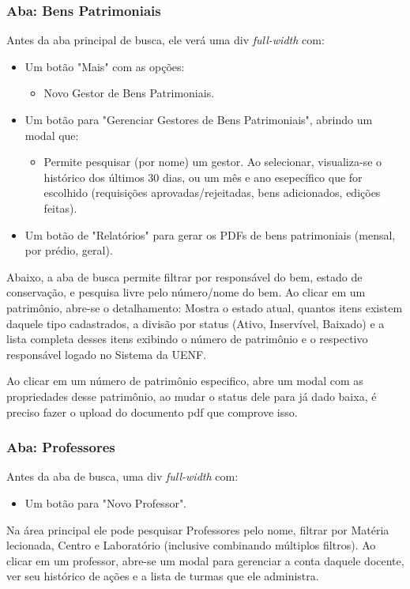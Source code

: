 \subsubsection{Aba: Bens Patrimoniais}
Antes da aba principal de busca, ele verá uma div \textit{full-width} com:
\begin{itemize}
    \item Um botão "Mais" com as opções:
     \begin{itemize}
         \item Novo Gestor de Bens Patrimoniais.
     \end{itemize}
    \item Um botão para "Gerenciar Gestores de Bens Patrimoniais", abrindo um modal que:
    \begin{itemize}
        \item Permite pesquisar (por nome) um gestor. Ao selecionar, visualiza-se o histórico dos últimos 30 dias, ou um mês e ano esepecífico que for escolhido (requisições aprovadas/rejeitadas, bens adicionados, edições feitas).
    \end{itemize}
    \item Um botão de "Relatórios" para gerar os PDFs de bens patrimoniais (mensal, por prédio, geral).
\end{itemize}
Abaixo, a aba de busca permite filtrar por responsável do bem, estado de conservação, e pesquisa livre pelo número/nome do bem. Ao clicar em um patrimônio, abre-se o detalhamento:
Mostra o estado atual, quantos itens existem daquele tipo cadastrados, a divisão por status (Ativo, Inservível, Baixado) e a lista completa desses itens exibindo o número de patrimônio e o respectivo responsável logado no Sistema da UENF.

Ao clicar em um número de patrimônio especifico, abre um modal com as propriedades desse patrimônio, ao mudar o status dele para já dado baixa, é preciso fazer o upload do documento pdf que comprove isso.
\subsubsection{Aba: Professores}
Antes da aba de busca, uma div \textit{full-width} com:
\begin{itemize}
    \item Um botão para "Novo Professor".
\end{itemize}
Na área principal ele pode pesquisar Professores pelo nome, filtrar por Matéria lecionada, Centro e Laboratório (inclusive combinando múltiplos filtros). Ao clicar em um professor, abre-se um modal para gerenciar a conta daquele docente, ver seu histórico de ações e a lista de turmas que ele administra.

